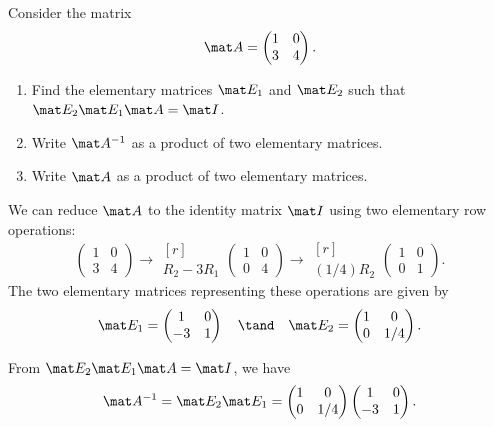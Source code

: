 \begin{problem}
    Consider the matrix \[\mat A = \begin{pmatrix}1 & 0 \\ 3 & 4\end{pmatrix}.\]
    \begin{enumerate}
        \item Find the elementary matrices $\mat E_1$ and $\mat E_2$ such that $\mat E_2 \mat E_1 \mat A = \mat I$.
        \item Write $\mat A^{-1}$ as a product of two elementary matrices.
        \item Write $\mat A$ as a product of two elementary matrices.
    \end{enumerate}
\end{problem}
\begin{solution}
    \begin{ppart}
        We can reduce $\mat A$ to the identity matrix $\mat I$ using two elementary row operations: \[\begin{pmatrix}1 & 0 \\ 3 & 4\end{pmatrix} \rightarrow \begin{matrix}[r] \\ \scriptstyle R_2 - 3R_1\end{matrix} \begin{pmatrix}1 & 0 \\ 0 & 4 \end{pmatrix} \rightarrow \begin{matrix}[r] \\ \scriptstyle (1/4) R_2\end{matrix} \begin{pmatrix}1 & 0 \\ 0 & 1\end{pmatrix}.\] The two elementary matrices representing these operations are given by \[\mat E_1 = \begin{pmatrix}1 & 0 \\ -3 & 1\end{pmatrix} \quad \tand \quad \mat E_2 = \begin{pmatrix}1 & 0 \\ 0 & 1/4\end{pmatrix}.\]
    \end{ppart}
    \begin{ppart}
        From $\mat E_2 \mat E_1 \mat A = \mat I$, we have \[\mat A^{-1} = \mat E_2 \mat E_1 = \begin{pmatrix}1 & 0 \\ 0 & 1/4\end{pmatrix} \begin{pmatrix}1 & 0 \\ -3 & 1\end{pmatrix}.\]

\end{ppart}
\end{solution}
